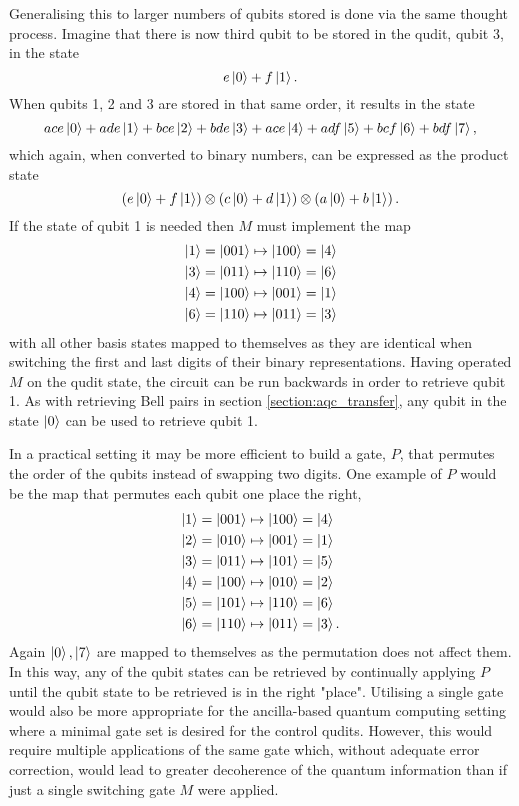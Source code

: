 Generalising this to larger numbers of qubits stored is done via the same thought process.
Imagine that there is now third qubit to be stored in the qudit, qubit 3, in the state
\begin{equation}
    e\ket{0} + f\ket{1}.
\end{equation}
When qubits 1, 2 and 3 are stored in that same order, it results in the state
\begin{equation}
    ace\ket{0} + ade\ket{1} + bce\ket{2} + bde\ket{3} + ace\ket{4} + adf\ket{5} + bcf\ket{6} + bdf\ket{7},
\end{equation}
which again, when converted to binary numbers, can be expressed as the product state
\begin{equation}
    \left(e\ket{0} + f\ket{1}\right) \otimes \left(c\ket{0} + d\ket{1}\right) \otimes \left(a\ket{0} + b\ket{1}\right).
\end{equation}
If the state of qubit 1 is needed then $M$ must implement the map
\begin{align}
    \ket{1} = \ket{001} &\mapsto \ket{100} = \ket{4}\\
    \ket{3} = \ket{011} &\mapsto \ket{110} = \ket{6}\\
    \ket{4} = \ket{100} &\mapsto \ket{001} = \ket{1}\\
    \ket{6} = \ket{110} &\mapsto \ket{011} = \ket{3}
\end{align}
with all other basis states mapped to themselves as they are identical when switching the first and last digits of their binary representations.
Having operated $M$ on the qudit state, the circuit can be run backwards in order to retrieve qubit 1. As with retrieving Bell pairs in section \ref{section:aqc_transfer}, any qubit in the state $\ket{0}$ can be used to retrieve qubit 1.

In a practical setting it may be more efficient to build a gate, $P$, that permutes the order of the qubits instead of swapping two digits.
One example of $P$ would be the map that permutes each qubit one place the right,
\begin{align}
    \ket{1} = \ket{001} &\mapsto \ket{100} = \ket{4}\\
    \ket{2} = \ket{010} &\mapsto \ket{001} = \ket{1}\\
    \ket{3} = \ket{011} &\mapsto \ket{101} = \ket{5}\\
    \ket{4} = \ket{100} &\mapsto \ket{010} = \ket{2}\\
    \ket{5} = \ket{101} &\mapsto \ket{110} = \ket{6}\\
    \ket{6} = \ket{110} &\mapsto \ket{011} = \ket{3}.
\end{align}
Again $\ket{0}, \ket{7}$ are mapped to themselves as the permutation does not affect them.
In this way, any of the qubit states can be retrieved by continually applying $P$ until the qubit state to be retrieved is in the right "place".
Utilising a single gate would also be more appropriate for the ancilla-based quantum computing setting where a minimal gate set is desired for the control qudits.
However, this would require multiple applications of the same gate which, without adequate error correction, would lead to greater decoherence of the quantum information than if just a single switching gate $M$ were applied.